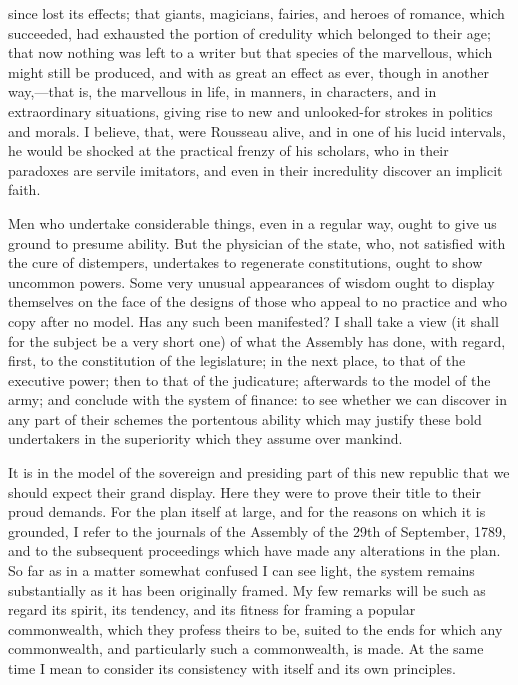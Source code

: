 since lost its effects; that giants, magicians, fairies, and heroes of romance, which succeeded, had exhausted the portion of credulity which belonged to their age; that now nothing was left to a writer but that species of the marvellous, which might still be produced, and with as great an effect as ever, though in another way,—that is, the marvellous in life, in manners, in characters, and in extraordinary situations, giving rise to new and unlooked-for strokes in politics and morals. I believe, that, were Rousseau alive, and in one of his lucid intervals, he would be shocked at the practical frenzy of his scholars, who in their paradoxes are servile imitators, and even in their incredulity discover an implicit faith.

Men who undertake considerable things, even in a regular way, ought to give us ground to presume ability. But the physician of the state, who, not satisfied with the cure of distempers, undertakes to regenerate constitutions, ought to show uncommon powers. Some very unusual appearances of wisdom ought to display themselves on the face of the designs of those who appeal to no practice and who copy after no model. Has any such been manifested? I shall take a view (it shall for the subject be a very short one) of what the Assembly has done, with regard, first, to the constitution of the legislature; in the next place, to that of the executive power; then to that of the judicature; afterwards to the model of the army; and conclude with the system of finance: to see whether we can discover in any part of their schemes the portentous ability which may justify these bold undertakers in the superiority which they assume over mankind.

It is in the model of the sovereign and presiding part of this new republic that we should expect their grand display. Here they were to prove their title to their proud demands. For the plan itself at large, and for the reasons on which it is grounded, I refer to the journals of the Assembly of the 29th of September, 1789, and to the subsequent proceedings which have made any alterations in the plan. So far as in a matter somewhat confused I can see light, the system remains substantially as it has been originally framed. My few remarks will be such as regard its spirit, its tendency, and its fitness for framing a popular commonwealth, which they profess theirs to be, suited to the ends for which any commonwealth, and particularly such a commonwealth, is made. At the same time I mean to consider its consistency with itself and its own principles.

